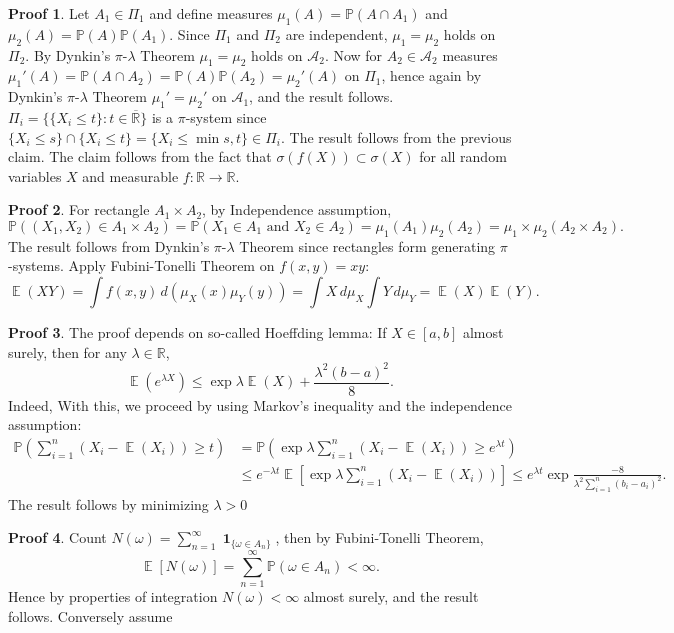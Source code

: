 \documentclass[hidelinks,11pt]{article}
\theoremstyle{definition}
\theoremstyle{dotless}
\newtheorem{prop}{Proof}[section]
\theoremstyle{remark}
\DeclareMathOperator{\E}{\mathbb{E}}
\DeclareMathOperator{\1}{\mathbf{1}}
\DeclareMathOperator{\0}{\mathbf{0}}
\begin{document}
\begin{prop}
Let $A_1\in\Pi_1$ and define measures $\mu_1(A)=\mathbb{P}(A\cap A_1)$ and $\mu_2(A)=\mathbb{P}(A)\mathbb{P}(A_1)$. Since $\Pi_1$ and $\Pi_2$ are independent, $\mu_1=\mu_2$ holds on $\Pi_2$. By Dynkin's $\pi$-$\lambda$ Theorem $\mu_1=\mu_2$ holds on $\mathcal{A}_2$. Now for $A_2\in\mathcal{A}_2$ measures $\mu_1'(A)=\mathbb{P}(A\cap A_2)=\mathbb{P}(A)\mathbb{P}(A_2)=\mu_2'(A)$ on $\Pi_1$, hence again by Dynkin's $\pi$-$\lambda$ Theorem $\mu_1'=\mu_2'$ on $\mathcal{A}_1$, and the result follows.\medbreak
$\Pi_i=\{\{X_i\leq t\}:t\in\overline{\mathbb{R}}\}$ is a $\pi$-system since $\{X_i\leq s\}\cap\{X_i\leq t\}=\{X_i\leq\min{s,t}\}\in\Pi_i$. The result follows from the previous claim.\medbreak
The claim follows from the fact that $\sigma(f(X))\subset\sigma(X)$ for all random variables $X$ and measurable $f:\mathbb{R}\to\mathbb{R}$.
\end{prop}

\begin{prop}
For rectangle $A_1\times A_2$, by Independence assumption,
\[\mathbb{P}((X_1,X_2)\in A_1\times A_2)=\mathbb{P}(X_1\in A_1\textrm{ and }X_2\in A_2)=\mu_1(A_1)\mu_2(A_2)=\mu_1\times\mu_2(A_2\times A_2).\]
The result follows from Dynkin's $\pi$-$\lambda$ Theorem since rectangles form generating $\pi$-systems.\medbreak
Apply Fubini-Tonelli Theorem on $f(x,y)=xy$:
\[\E(XY)=\int f(x,y)\,d(\mu_X(x)\mu_Y(y))=\int X\,d\mu_X\int Y\,d\mu_Y=\E(X)\E(Y).\]
\end{prop}

\begin{prop}
The proof depends on so-called Hoeffding lemma: If $X\in[a,b]$ almost surely, then for any $\lambda\in\mathbb{R}$,
\[\E(e^{\lambda X})\leq\exp{\lambda\E(X)+\frac{\lambda^2(b-a)^2}{8}}.\]
Indeed,\medbreak
With this, we proceed by using Markov's inequality and the independence assumption:
\begin{align*}
    \mathbb{P}\left(\sum_{i=1}^n(X_i-\E(X_i))\geq t\right)&=\mathbb{P}\left(\exp{\lambda\sum_{i=1}^n(X_i-\E(X_i))}\geq e^{\lambda t}\right)\\
    &\leq e^{-\lambda t}\E\left[\exp{\lambda\sum_{i=1}^n(X_i-\E(X_i))}\right]\leq e^{\lambda t}\exp{\frac{-8}{\lambda^2\sum_{i=1}^n(b_i-a_i)^2}}.
\end{align*}
The result follows by minimizing $\lambda>0$
\end{prop}

\begin{prop}
Count $N(\omega)=\sum_{n=1}^\infty\1_{\{\omega\in A_n\}}$, then by Fubini-Tonelli Theorem,
\[\E[N(\omega)]=\sum_{n=1}^\infty\mathbb{P}(\omega\in A_n)<\infty.\] Hence by properties of integration $N(\omega)<\infty$ almost surely, and the result follows.\medbreak
Conversely assume
\end{prop}
\end{document}
